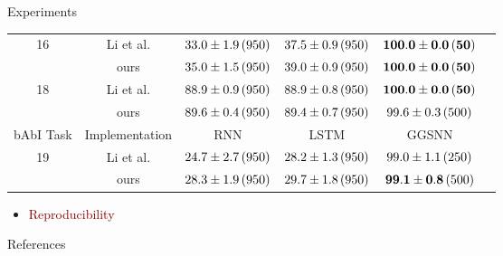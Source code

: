 \documentclass[final,hyperref={pdfpagelabels=false}]{beamer}
\begin{document}
\begin{frame}[t]
\begin{columns}[t]
\begin{column}{.3\textwidth}
\begin{block}{Experiments}
\begin{table}[t]
\begin{tabular}{cccccc}
              \multirow{2}{*}{16} & Li et al. &  $33.0 \pm 1.9\thinspace (950)$&  $37.5 \pm 0.9\thinspace (950)$ & $\mathbf{100.0 \pm 0.0\thinspace (50)}$  \\
              & ours & $35.0 \pm 1.5\thinspace (950)$ & $39.0 \pm 0.9\thinspace (950)$ & $\mathbf{100.0 \pm 0.0\thinspace (50)}$ \\  \midrule
        
              \multirow{2}{*}{18} & Li et al. & $88.9 \pm 0.9\thinspace (950)$ & $88.9 \pm 0.8\thinspace (950)$ & $\mathbf{100.0 \pm 0.0\thinspace (50)}$ \\
              & ours & $89.6 \pm 0.4\thinspace (950)$ & $89.4 \pm 0.7\thinspace (950)$ & $99.6\pm 0.3\thinspace (500)$\\ \midrule
              
              bAbI Task & Implementation & RNN & LSTM & GGSNN \\  \midrule
              
              \multirow{2}{*}{19} & Li et al. & $24.7 \pm 2.7\thinspace (950)$ & $28.2 \pm 1.3\thinspace (950)$ & $99.0\pm1.1\thinspace (250)$\\ 
              & ours & $28.3 \pm 1.9\thinspace (950)$ & $29.7 \pm 1.8\thinspace (950)$ & $\mathbf{99.1\pm 0.8}\thinspace (500)$\\ \bottomrule
        \end{tabular}
        \end{table}
        \vspace{0.2in}
        
    \begin{itemize}
        \item \textcolor{darkred}{Reproducibility}\thinspace 
    \end{itemize}
    \end{block}

    \begin{block}{References}
      \linespread{0.928}\selectfont
      \footnotesize{
      }
    \end{block}

  \end{column} %

  \begin{column}{.02\textwidth}\end{column} %

\end{columns} %

\end{frame} %
\end{document}
